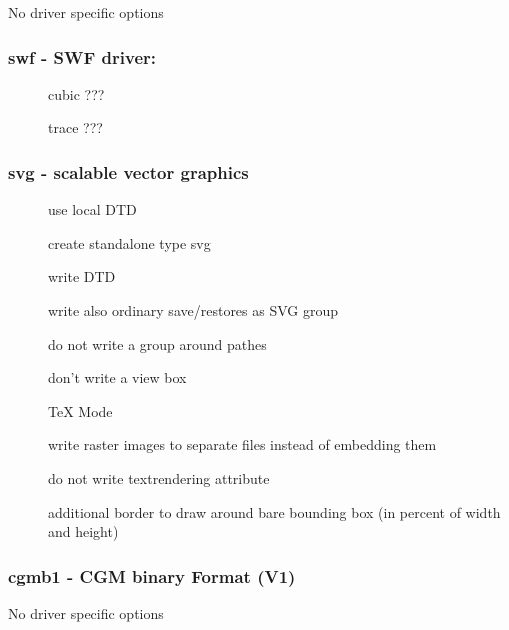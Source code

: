 \documentclass[english,a4paper]{article}
\begin{document}
No driver specific options
\subsubsection{swf - SWF driver: }
\begin{description}
\item[] 
cubic ???


\item[] 
trace ???


\end{description}
\subsubsection{svg - scalable vector graphics}
\begin{description}
\item[] 
use local DTD


\item[] 
create standalone type svg


\item[] 
write DTD


\item[] 
write also ordinary save/restores as SVG group


\item[] 
do not write a group around pathes


\item[] 
don't write a view box


\item[] 
TeX Mode


\item[] 
write raster images to separate files instead of embedding them


\item[] 
do not write textrendering attribute


\item[] 
additional border to draw around bare bounding box (in percent of width and height)


\end{description}
\subsubsection{cgmb1 - CGM binary Format (V1)}
No driver specific options
\end{document}

